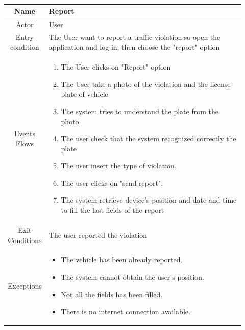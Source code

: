 \documentclass[12pt,a4paper]{report}
\begin{document}
				\begin{table}[H]
					\centering
					\begin{tabular}{|c|p{0.92\linewidth}|}
						\hline
						Name & {Report} \\
						\hline
						Actor & {User} \\
						\hline
						Entry condition & {The User want to report a traffic violation so open the application and log in,
									then choose the "report" option} \\
						\hline
						Events Flows &{ 
								\vskip 4pt
								\begin{enumerate}
									\item The User clicks on "Report" option
									\item The User take a photo of the violation and the license plate of vehicle
									\item The system tries to understand the plate from the photo
									\item The user check that the system recognized correctly the plate
									\item The user insert the type of violation.
									\item The user clicks on "send report".
									\item The system retrieve device's position and date and time to fill the last fields
										of the report
								\end{enumerate}
								\vskip 4pt}\\
						\hline
						Exit Conditions & {The user reported the violation} \\
						\hline
						Exceptions & {
								\vskip 4pt
								\begin{itemize}
									\item The vehicle has been already reported.
									\item The system cannot obtain the user's position.
									\item Not all the fields has been filled.
									\item There is no internet connection available.
								\end{itemize}
								\vskip 4pt
						} \\
						\hline
					\end{tabular}
					\caption{}
					\label{tab: }
				\end{table}
\end{document}
